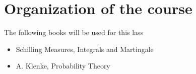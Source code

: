 \section{Organization of the course}
The following books will be used for this lass
\begin{itemize}
\item Schilling Measures, Integrals and Martingale
\item A. Klenke, Probability Theory
\end{itemize}